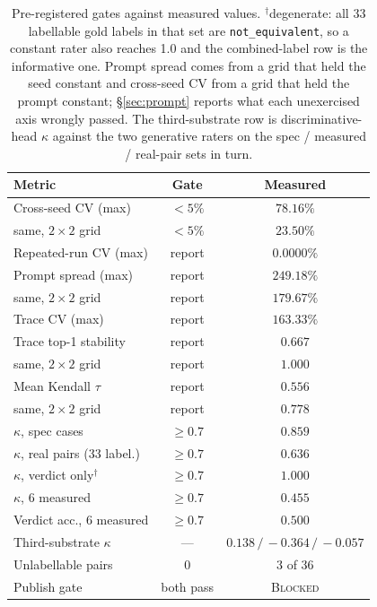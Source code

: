 \documentclass[10pt,twocolumn]{article}
\begin{document}
\begin{table}[h]
\vspace{-0.4em}
\centering\footnotesize\setlength{\tabcolsep}{2.5pt}
\begin{tabular}{lcc}
\toprule
\textbf{Metric} & \textbf{Gate} & \textbf{Measured} \\
\midrule
Cross-seed CV (max) & $<5\%$ & $78.16\%$ \\
\quad same, $2\times2$ grid & $<5\%$ & $23.50\%$ \\
Repeated-run CV (max) & report & $0.0000\%$ \\
Prompt spread (max) & report & $249.18\%$ \\
\quad same, $2\times2$ grid & report & $179.67\%$ \\
Trace CV (max) & report & $163.33\%$ \\
Trace top-1 stability & report & $0.667$ \\
\quad same, $2\times2$ grid & report & $1.000$ \\
Mean Kendall $\tau$ & report & $0.556$ \\
\quad same, $2\times2$ grid & report & $0.778$ \\
$\kappa$, spec cases & $\geq0.7$ & $0.859$ \\
$\kappa$, real pairs (33 label.) & $\geq0.7$ & $0.636$ \\
$\kappa$, verdict only$^{\dagger}$ & $\geq0.7$ & $1.000$ \\
$\kappa$, 6 measured & $\geq0.7$ & $0.455$ \\
Verdict acc., 6 measured & $\geq0.7$ & $0.500$ \\
\midrule
Third-substrate $\kappa$ & --- & $0.138\,/\,-0.364\,/\,-0.057$ \\
Unlabellable pairs & 0 & $3$ of $36$ \\
\midrule
Publish gate & both pass & \textsc{Blocked} \\
\bottomrule
\end{tabular}
\vspace{-0.5em}
\caption{Pre-registered gates against measured values. $^{\dagger}$degenerate: all 33
labellable gold labels in that set are \texttt{not\_equivalent}, so a constant rater
also reaches 1.0 and the combined-label row is the informative one. Prompt spread
comes from a
grid that held the seed constant and cross-seed CV from a grid that held the prompt
constant; \S\ref{sec:prompt} reports what each unexercised axis wrongly passed.
The third-substrate row is discriminative-head $\kappa$ against the two generative
raters on the spec / measured / real-pair sets in turn.}
\label{tab:metrics}
\end{table}
\end{document}
